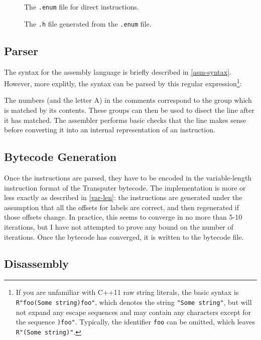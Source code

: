 \begin{figure}[H]
  
  \caption{The \texttt{.enum} file for direct instructions.}
  \label{direct-enum}
\end{figure}
\begin{figure}[H]
  
  \caption{The \texttt{.h} file generated from the \texttt{.enum} file.}
  \label{direct-h}
\end{figure}

\subsection{Parser}

The syntax for the assembly language is briefly described in \ref{asm-syntax}.
However, more explitly, the syntax can be parsed by this regular
expression\footnote{If you are unfamiliar with C++11 raw string literals, the
basic syntax is \texttt{R"foo(Some string)foo"}, which denotes the string
\texttt{"Some string"}, but will not expand any escape sequences and may contain
any characters except for the sequence \texttt{)foo"}. Typically, the identifier
\texttt{foo} can be omitted, which leaves \texttt{R"(Some string)"}.}:


The numbers (and the letter A) in the comments correspond to the group which is
matched by its contents. These groups can then be used to disect the line after
it has matched.  The assembler performs basic checks that the line makes sense
before converting it into an internal representation of an instruction.

\subsection{Bytecode Generation}

Once the instructions are parsed, they have to be encoded in the variable-length
instruction format of the Transputer bytecode. The implementation is more or
less exactly as described in \ref{var-len}: the instructions are generated under
the assumption that all the offsets for labels are correct, and then regenerated
if those offsets change. In practice, this seems to converge in no more than
5-10 iterations, but I have not attempted to prove any bound on the number of
iterations. Once the bytecode has converged, it is written to the bytecode file.

\subsection{Disassembly}

